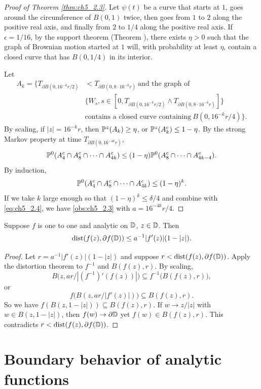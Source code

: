 \begin{proof}[Proof of Theorem \ref{thm:ch5_2.3}]
Let $\psi(t)$ be a curve that starts at $1$, goes around the circumference of $B(0,1)$ twice, then goes from $1$ to $2$ along the positive real axis, and finally from $2$ to $1/4$ along the positive real axis. If $\epsilon = 1/16$, by the support theorem (Theorem ), there exists $\eta > 0$ such that the graph of Brownian motion started at $1$ will, with probability at least $\eta$, contain a closed curve that has $B(0,1/4)$ in its interior.

Let
\begin{align*}
    A_k = \{T_{\partial B(0,16^{-k}r/2)} &< T_{\partial B(0,8\cdot16^{-k}r)} ~\text{and the graph of} \\
    &\{W_s, s \in [0,T_{\partial B(0,16^{-k}r/2)} \wedge T_{\partial B(0,8\cdot16^{-k}r)}]\} \\
    &\text{contains a closed curve containing}~B(0,16^{-k}r/4)\}.
\end{align*}
By scaling, if $|z| = 16^{-k}r$, then $\P^z(A_k) \geq \eta$, or $\P^z(A_k^c) \leq 1-\eta$. By the strong Markov property at time $T_{\partial B(0,16^{-4k}r)}$,
\[
    \P^0(A_4^c \cap A_8^c \cap \cdots \cap A_{4k}^c) \leq (1-\eta)\P^0(A_8^c \cap \cdots \cap A_{4k-4}^c).
\]
By induction,
\[
    \P^0(A_4^c \cap A_8^c \cap \cdots \cap A_{4k}^c) \leq (1-\eta)^k.
\]
If we take $k$ large enough so that $(1-\eta)^k \leq \delta/4$ and combine with \eqref{eq:ch5_2.4}, we have \eqref{obs:ch5_2.3} with $a = 16^{-4k}r/4$.
\end{proof}

\begin{corollary}\label{cor:ch5_2.6}
Suppose $f$ is one to one and analytic on $\D$, $z \in \D$. Then
\[
    \dist(f(z),\partial f(\D)) \leq a^{-1}|f'(z)|(1-|z|).
\]
\end{corollary}

\begin{proof}
Let $r = a^{-1}|f'(z)|(1-|z|)$ and suppose $r < \dist(f(z),\partial f(\D))$. Apply the distortion theorem to $f^{-1}$ and $B(f(z),r)$. By scaling,
\[
    B\big(z,ar/|(f^{-1})'(f(z))|\big) \subseteq f^{-1}\big(B(f(z),r)\big),
\]
or
\[
    f\big(B(z,ar/|f'(z)|)\big) \subseteq B(f(z),r).
\]
So we have $f(B(z,1-|z|)) \subseteq B(f(z),r)$. If $w \to z/|z|$ with $w \in B(z,1-|z|)$, then $f(w) \to \partial \D$ yet $f(w) \in B(f(z),r)$. This contradicts $r < \dist(f(z),\partial f(\D))$.
\end{proof}

\section{Boundary behavior of analytic functions}\label{ch5_sec3}


